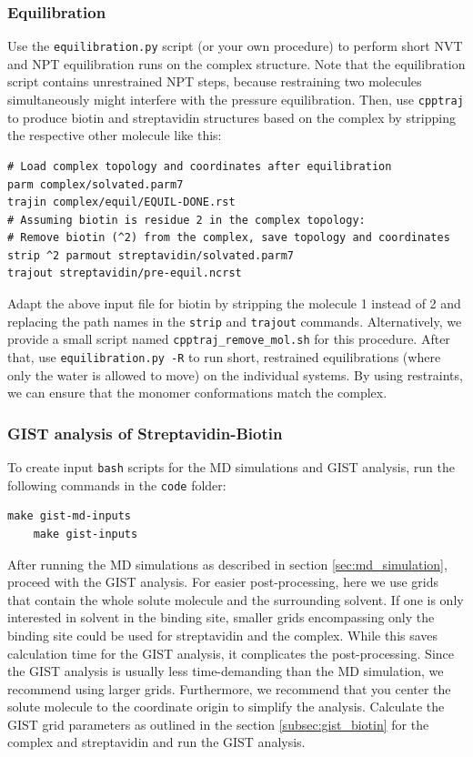 \documentclass[9pt,tutorial,pubversion]{livecoms}
\newcommand{\software}{\texttt}
\newcommand{\code}{\texttt}
\newcommand\inlinecode{\texttt}
\begin{document}
\subsubsection{Equilibration}
Use the \software{equilibration.py} script (or your own procedure) to perform short NVT and NPT equilibration runs on the complex structure.
Note that the equilibration script contains unrestrained NPT steps, because restraining two molecules simultaneously might interfere with the pressure equilibration.
Then, use \software{cpptraj} to produce biotin and streptavidin structures based on the complex by stripping the respective other molecule like this:
\begin{lstlisting}[style=cpptraj]
# Load complex topology and coordinates after equilibration
parm complex/solvated.parm7
trajin complex/equil/EQUIL-DONE.rst
# Assuming biotin is residue 2 in the complex topology:
# Remove biotin (^2) from the complex, save topology and coordinates
strip ^2 parmout streptavidin/solvated.parm7
trajout streptavidin/pre-equil.ncrst
\end{lstlisting}
Adapt the above input file for biotin by stripping the molecule 1 instead of 2 and replacing the path names in the \inlinecode{strip} and  \inlinecode{trajout} commands.
Alternatively, we provide a small script named \software{cpptraj\_remove\_mol.sh} for this procedure.
After that, use \software{equilibration.py -R} to run short, restrained 
equilibrations (where only the water is allowed to move) on the individual 
systems.
By using restraints, we can ensure that the monomer conformations match the complex.

\subsubsection{GIST analysis of Streptavidin-Biotin}
To create input \code{bash} scripts for the MD simulations and GIST analysis, run the following commands in the \code{code} folder:
\begin{lstlisting}[style=bash]
	make gist-md-inputs
	make gist-inputs
\end{lstlisting}
After running the MD simulations as described in section \ref{sec:md_simulation}, proceed with the GIST analysis.
For easier post-processing, here we use grids that contain the whole solute molecule and the surrounding solvent.
If one is only interested in solvent in the binding site, smaller grids encompassing only the binding site could be used for streptavidin and the complex.
While this saves calculation time for the GIST analysis, it complicates the post-processing.
Since the GIST analysis is usually less time-demanding than the MD simulation, we recommend using larger grids.
Furthermore, we recommend that you center the solute molecule to the coordinate origin to simplify the analysis.
Calculate the GIST grid parameters as outlined in the section \ref{subsec:gist_biotin} for the complex and streptavidin and run the GIST analysis.
\end{document}
